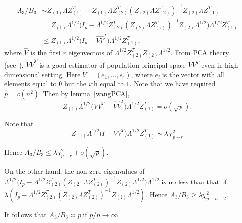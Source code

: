 \documentclass[review]{elsarticle}
\theoremstyle{plain}
\theoremstyle{definition}
\theoremstyle{remark}
\begin{document}
\begin{equation}
    \begin{aligned}
        A_3/B_3&\sim Z_{(1)}\Lambda Z_{(1)}^T-Z_{(1)}\Lambda Z_{(2)}^T{(Z_{(2)}\Lambda Z_{(2)}^T)}^{-1}Z_{(2)}\Lambda Z_{(1)}^T\\
        &=Z_{(1)}\Lambda^{1/2}\big(I_p -\Lambda^{1/2} Z_{(2)}^T{(Z_{(2)}\Lambda Z_{(2)}^T)}^{-1}Z_{(2)}\Lambda^{1/2} \big)\Lambda^{1/2}Z_{(1)}^T\\
        &\leq Z_{(1)}\Lambda^{1/2}\big(I_p -\hat{V}\hat{V}^T\big)\Lambda^{1/2}Z_{(1)}^T,
    \end{aligned}
\end{equation}
where $\hat{V}$ is the first $r$ eigenvectors of $\Lambda^{1/2}Z_{(2)}^T Z_{(2)}\Lambda^{1/2}$. From PCA theory (see~\cite{Cai2012Sparse}), $\hat{V}\hat{V}^T$ is a good estimator of population principal space $VV^T$ even in high dimensional setting. Here 
 $V=(e_1,\ldots, e_r)$, where $e_i$ is the vector with all elements equal to $0$ but the $i$th equal to $1$. Note that we have required $p=o(n^2)$. Then by lemma~\ref{wangPCA},
\begin{equation}
    Z_{(1)}\Lambda^{1/2}\big(VV^T -\hat{V}\hat{V}^T\big)\Lambda^{1/2}Z_{(1)}^T=o(\sqrt{p}).
\end{equation}

Note that
\begin{equation}
    Z_{(1)}\Lambda^{1/2}\big (I-VV^T) \Lambda^{1/2}Z_{(1)}^T\sim\lambda \chi^2_{p-r}
\end{equation}

Hence $A_3/B_3\leq \lambda\chi^2_{p-r}+o(\sqrt{p})$.

On the other hand, the non-zero eigenvalues of $\Lambda^{1/2}\big(I_p -\Lambda^{1/2} Z_{(2)}^T{(Z_{(2)}\Lambda Z_{(2)}^T)}^{-1}Z_{(2)}\Lambda^{1/2} \big)\Lambda^{1/2}$ is no less than that of $\lambda(I_p -\Lambda^{1/2} Z_{(2)}^T{(Z_{(2)}\Lambda Z_{(2)}^T)}^{-1}Z_{(2)}\Lambda^{1/2})$.
Hence $A_3/B_3\geq \lambda \chi^2_{p-n+2}$.

It follows that $A_3/B_3\asymp p$ if $p/n\to \infty$.


\end{document}
